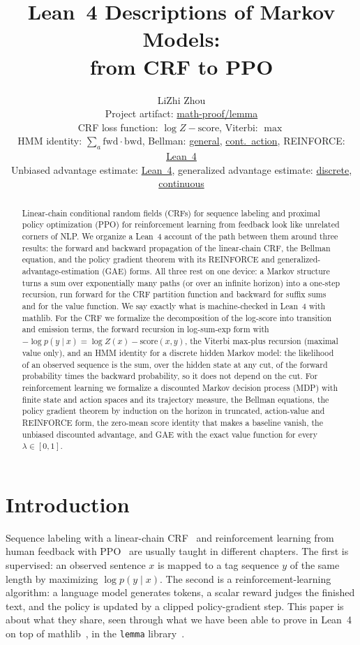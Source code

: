 \documentclass[11pt,a4paper]{article}
\title{Lean~4 Descriptions of Markov Models:\\ from CRF to PPO}
\author{LiZhi Zhou\\[0.3em]
\small Project artifact: \href{https://github.com/math-proof/lemma}{math-proof/lemma}\\[0.4em]
\small
CRF loss function:
\href{http://www.lemma.cn/lean/?module=Random.All_Eq_AddLogSumExpAdd.All_EqNegLogProb.of.All_Eq_LogProbCond.All_Eq_LogProbCond.Eq_LogProbJoint.All_Lt0ProbJoint.IsDiscreteHMM}{$\log Z-\text{score}$},
\quad
Viterbi:
\href{http://www.lemma.cn/lean/?module=Random.All_Eq_Add_MaxAdd.EqMax_ProbJoint.of.All_Eq_LogProbCond.All_Eq_LogProbCond.Eq_LogProbJoint.All_Lt0ProbJoint.IsDiscreteHMM}{$\max$}\\[0.25em]
HMM identity:
\href{http://www.lemma.cn/lean/?module=Random.Sum_Mul_ProbCond.eq.Prob.of.IsDiscreteHMM}{$\sum_a\text{fwd}\cdot\text{bwd}$},
\quad
Bellman:
\href{http://www.lemma.cn/lean/?module=Random.MEq_Expect.MEq_Expect.MEq_Expect.of.All_MEq_Expect.All_MEq_Expect.CondIndep_Joint.GtInftySup.All_MeasurableJoint.In_Ico}{general},
\href{http://www.lemma.cn/lean/?module=Random.Eq_Expect.Eq_Expect.MEq_Expect.of.All_Eq_Expect.All_MEq_Expect.CondIndep.All_Measurable.GtInftySup.All_MeasurableJoint.In_Ico}{cont.\ action},
\quad
REINFORCE:
\href{http://www.lemma.cn/lean/?module=Random.GradExpectDotPow_Id.eq.ExpectDot_FunSMul_GradLogProbCond.of.GtInftySup.All_Differentiable_Prob.All_NeProb_0.IsPolicyTrajectory.In_Ico}{Lean~4}\\[0.25em]
Unbiased advantage estimate:
\href{http://www.lemma.cn/lean/?module=Random.GradExpectDotPow_Id.eq.ExpectDot_FunSMul_GradLogProbCond.of.GtInftySup.All_Differentiable_Prob.All_NeProb_0.IsPolicyTrajectory.In_Ico#advantage}{Lean~4},
\quad
generalized advantage estimate:
\href{http://www.lemma.cn/lean/?module=Random.GradExpectDotPow_Id.eq.ExpectDot_FunSMul_GradLogProbCond.of.GtInftySup.All_Differentiable_Prob.All_NeProb_0.IsPolicyTrajectory.In_Icc.In_Ico}{discrete},
\href{http://www.lemma.cn/lean/?module=Random.GradExpectDotPow_Id.eq.ExpectDotFunSMul_GradLogProbCond.of.GtInftySup.Any_And_All_IntegrableMeasureAndGtInftySup.All_Differentiable_Prob.All_NeDens_0.All_Eq_JointDens.AbsContJointAS.AbsContStateMarginal.IsPolicyTrajectory.Subset_Ico}{continuous}}
\date{}
\begin{document}
\maketitle

\begin{abstract}
Linear-chain conditional random fields (CRFs) for sequence labeling and proximal policy optimization (PPO) for reinforcement learning from feedback look like unrelated corners of NLP.
We organize a Lean~4 account of the path between them around three results: the forward and backward propagation of the linear-chain CRF, the Bellman equation, and the policy gradient theorem with its REINFORCE and generalized-advantage-estimation (GAE) forms.
All three rest on one device: a Markov structure turns a sum over exponentially many paths (or over an infinite horizon) into a one-step recursion, run forward for the CRF partition function and backward for suffix sums and for the value function.
We say exactly what is machine-checked in Lean~4 with mathlib.
For the CRF we formalize the decomposition of the log-score into transition and emission terms, the forward recursion in log-sum-exp form with $-\log p(y\mid x)=\log Z(x)-\text{score}(x,y)$, the Viterbi max-plus recursion (maximal value only), and an HMM identity for a discrete hidden Markov model: the likelihood of an observed sequence is the sum, over the hidden state at any cut, of the forward probability times the backward probability, so it does not depend on the cut.
For reinforcement learning we formalize a discounted Markov decision process (MDP) with finite state and action spaces and its trajectory measure, the Bellman equations, the policy gradient theorem by induction on the horizon in truncated, action-value and REINFORCE form, the zero-mean score identity that makes a baseline vanish, the unbiased discounted advantage, and GAE with the exact value function for every $\lambda\in[0,1]$.
\end{abstract}

\section{Introduction}
\label{sec:intro}

Sequence labeling with a linear-chain CRF~\cite{lafferty2001crf,sutton2012crf} and reinforcement learning from human feedback with PPO~\cite{schulman2017ppo,ziegler2019finetuning,ouyang2022instructgpt} are usually taught in different chapters.
The first is supervised: an observed sentence $x$ is mapped to a tag sequence $y$ of the same length by maximizing $\log p(y\mid x)$.
The second is a reinforcement-learning algorithm: a language model generates tokens, a scalar reward judges the finished text, and the policy is updated by a clipped policy-gradient step.
This paper is about what they share, seen through what we have been able to prove in Lean~4~\cite{moura2021lean4} on top of mathlib~\cite{mathlib2020,mathlib}, in the \texttt{lemma} library~\cite{lemma_repo}.
\end{document}
